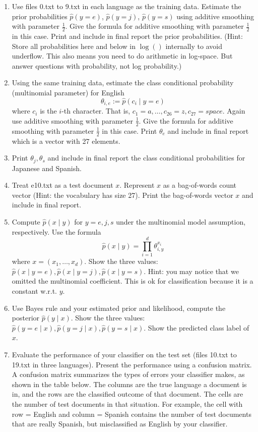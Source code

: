 \documentclass[a4paper]{article}
\theoremstyle{definition}
\begin{document}
\begin{enumerate}
\item
Use files 0.txt to 9.txt in each language as the training data.
Estimate the prior probabilities 
$\hat p(y=e)$,
$\hat p(y=j)$,
$\hat p(y=s)$
using additive smoothing with parameter $\frac{1}{2}$. 
Give the formula for additive smoothing with parameter $\frac{1}{2}$ in this case. 
Print and include in final report the prior probabilities.
(Hint: Store all probabilities here and below in $\log()$ internally to avoid underflow. This also means you need to do arithmetic in log-space.  But answer questions with probability, not log probability.)


\item
Using the same training data, estimate the class conditional probability (multinomial parameter) for English
$$\theta_{i,e} := \hat p(c_i \mid y=e)$$ 
where $c_i$ is the $i$-th character. That is, $c_1 = a, \ldots, c_{26} = z, c_{27} = space$.
Again use additive smoothing with parameter $\frac{1}{2}$.
Give the formula for additive smoothing with parameter $\frac{1}{2}$ in this case. 
Print $\theta_e$ and include in final report which is a vector with 27 elements.


\item
Print $\theta_j, \theta_s$ and include in final report the class conditional probabilities for Japanese and Spanish.

\item
Treat e10.txt as a test document $x$.
Represent $x$ as a bag-of-words count vector (Hint: the vocabulary has size 27).
Print the bag-of-words vector $x$ and include in final report.

\item
Compute $\hat p(x \mid y)$ for $y=e, j, s$ under the multinomial model assumption, respectively.
Use the formula
$$\hat p(x \mid y) = \prod_{i=1}^d \theta_{i, y}^{x_i}$$
where $x=(x_1, \ldots, x_d)$.
Show the three values: $\hat p(x \mid y=e), \hat p(x \mid y=j), \hat p(x \mid y=s)$.
Hint: you may notice that we omitted the multinomial coefficient.  This is ok for classification because it is a constant w.r.t. $y$.


\item
Use Bayes rule and your estimated prior and likelihood, compute the posterior $\hat p(y \mid x)$.
Show the three values: $\hat p(y=e \mid x), \hat p(y=j \mid x), \hat p(y=s \mid x)$.
Show the predicted class label of $x$.


\item
Evaluate the performance of your classifier on the test set (files 10.txt to 19.txt in three languages).
Present the performance using a confusion matrix. A confusion matrix summarizes the types of errors your classifier makes, as shown in the table below.   The columns are the true language a document is in, and the rows are the classified outcome of that document.  The cells are the number of test documents in that situation.  For example, the cell with row = English and column = Spanish contains the number of test documents that are really Spanish, but misclassified as English by your classifier.


\end{enumerate}
\end{document}
